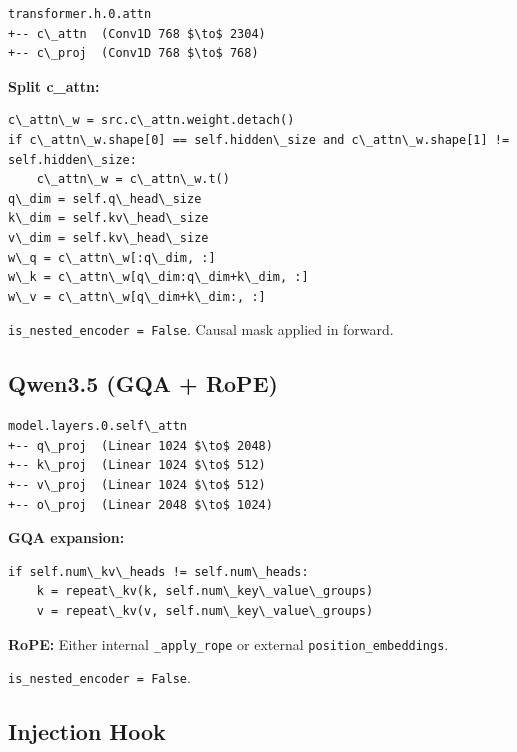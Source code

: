 \begin{lstlisting}
transformer.h.0.attn
+-- c\_attn  (Conv1D 768 $\to$ 2304)
+-- c\_proj  (Conv1D 768 $\to$ 768)
\end{lstlisting}

\textbf{Split c\_attn:}
\begin{lstlisting}
c\_attn\_w = src.c\_attn.weight.detach()
if c\_attn\_w.shape[0] == self.hidden\_size and c\_attn\_w.shape[1] != self.hidden\_size:
    c\_attn\_w = c\_attn\_w.t()
q\_dim = self.q\_head\_size
k\_dim = self.kv\_head\_size
v\_dim = self.kv\_head\_size
w\_q = c\_attn\_w[:q\_dim, :]
w\_k = c\_attn\_w[q\_dim:q\_dim+k\_dim, :]
w\_v = c\_attn\_w[q\_dim+k\_dim:, :]
\end{lstlisting}

\texttt{is\_nested\_encoder = False}. Causal mask applied in forward.

\subsection{Qwen3.5 (GQA + RoPE)}

\begin{lstlisting}
model.layers.0.self\_attn
+-- q\_proj  (Linear 1024 $\to$ 2048)
+-- k\_proj  (Linear 1024 $\to$ 512)
+-- v\_proj  (Linear 1024 $\to$ 512)
+-- o\_proj  (Linear 2048 $\to$ 1024)
\end{lstlisting}

\textbf{GQA expansion:}
\begin{lstlisting}
if self.num\_kv\_heads != self.num\_heads:
    k = repeat\_kv(k, self.num\_key\_value\_groups)
    v = repeat\_kv(v, self.num\_key\_value\_groups)
\end{lstlisting}

\textbf{RoPE:} Either internal \texttt{\_apply\_rope} or external \texttt{position\_embeddings}.

\texttt{is\_nested\_encoder = False}.

\subsection{Injection Hook}


